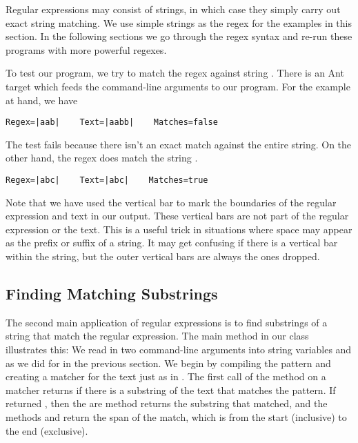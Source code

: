 Regular expressions may consist of strings, in which case they
simply carry out exact string matching.  
We use simple strings as the regex for the examples in this section.
In the following sections we go through the regex syntax
and re-run these programs with more powerful regexes.

To test our program, we try to match the regex
 against string .
There is an Ant target  which feeds the command-line
arguments to our program.  For the example at hand, we have
%
\begin{verbatim}
Regex=|aab|    Text=|aabb|    Matches=false
\end{verbatim}
%
The test fails because there isn't an exact match
against the entire string.
On the other hand, the regex  does match
the string .
%
\begin{verbatim}
Regex=|abc|    Text=|abc|    Matches=true
\end{verbatim}
%
Note that we have used the vertical bar to mark the boundaries of the
regular expression and text in our output.  These vertical bars are
not part of the regular expression or the text.  This is a useful
trick in situations where space may appear as the prefix or suffix of
a string.  It may get confusing if there is a vertical bar within the
string, but the outer vertical bars are always the ones dropped.

\subsection{Finding Matching Substrings}\label{section:regex-find}

The second main application of regular expressions is to find
substrings of a string that match the regular expression.  The main
method in our class  illustrates this:
%
%
We read in two
command-line arguments into string variables  and 
as we did for  in the previous section.  We begin
by compiling the pattern and creating a matcher for the text just
as in .
%
%
The first call of the  method on a matcher returns
 if there is a substring of the text that matches the
pattern.  If  returned , then the are method
 returns the substring that matched, and the methods
 and  return the span of the match, which is
from the start (inclusive) to the end (exclusive).

